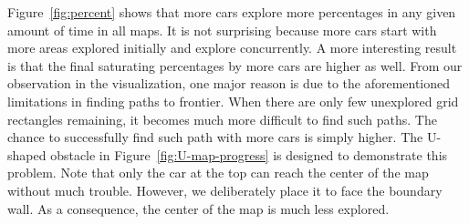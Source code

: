 Figure~\ref{fig:percent} shows that more cars explore more percentages in any given amount of time in all maps.
It is not surprising because more cars start with more areas explored initially and explore concurrently.
A more interesting result is that the final saturating percentages by more cars are higher as well.
From our observation in the visualization, one major reason is due to the aforementioned limitations in finding paths to frontier.
When there are only few unexplored grid rectangles remaining,
it becomes much more difficult to find such paths.
The chance to successfully find such path with more cars is simply higher.
The U-shaped obstacle in Figure~\ref{fig:U-map-progress} is designed to demonstrate this problem.
Note that only the car at the top can reach the center of the map without much trouble.
However, we deliberately place it to face the boundary wall.
As a consequence, the center of the map is much less explored.
